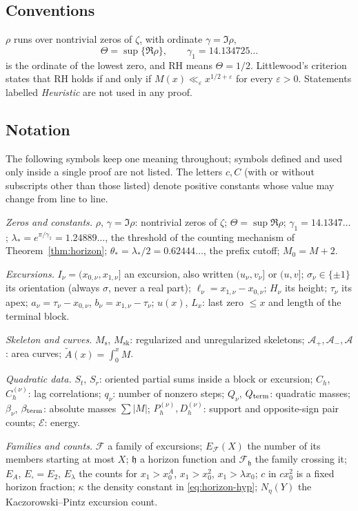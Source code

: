 \documentclass[11pt]{amsart}
\numberwithin{equation}{section}
\theoremstyle{plain}
\theoremstyle{definition}
\theoremstyle{remark}
\newcommand{\Ms}{M_{\mathrm{s}}}
\newcommand{\Msk}{M_{\mathrm{sk}}}
\newcommand{\Ap}{\mathcal{A}_{+}}
\newcommand{\Am}{\mathcal{A}_{-}}
\newcommand{\Anet}{\mathcal{A}}
\newcommand{\eps}{\varepsilon}
\newcommand{\En}{\mathcal{E}}
\newcommand{\F}{\mathcal{F}}
\begin{document}
\subsection*{Conventions}
$\rho$ runs over nontrivial zeros of $\zeta$, with ordinate $\gamma=\Im\rho$,
\[
\Theta=\sup\{\Re\rho\},\qquad \gamma_1=14.134725\ldots
\]
is the ordinate of the lowest zero, and RH means $\Theta=1/2$. Littlewood's
criterion \cite[\S14.25]{Titchmarsh1986} states that RH holds if and only if
$M(x)\ll_\eps x^{1/2+\eps}$ for every $\eps>0$. Statements labelled
\emph{Heuristic} are not used in any proof.

\subsection*{Notation}
\label{subsec:notation}
The following symbols keep one meaning throughout; symbols defined and used
only inside a single proof are not listed. The letters $c,C$ (with or without
subscripts other than those listed) denote positive constants whose value may
change from line to line.

\smallskip
\noindent\emph{Zeros and constants.}
$\rho$, $\gamma=\Im\rho$: nontrivial zeros of $\zeta$;
$\Theta=\sup\Re\rho$;
$\gamma_1=14.1347\ldots$;
$\lambda_*=e^{\pi/\gamma_1}=1.24889\ldots$, the threshold of the counting
mechanism of Theorem~\ref{thm:horizon};
$\theta_*=\lambda_*/2=0.62444\ldots$, the prefix cutoff;
$M_0=M+2$.

\smallskip
\noindent\emph{Excursions.}
$I_\nu=(x_{0,\nu},x_{1,\nu}]$ an excursion, also written $(u_\nu,v_\nu]$ or
$(u,v]$; $\sigma_\nu\in\{\pm1\}$ its orientation (always $\sigma$, never a
real part); $\ell_\nu=x_{1,\nu}-x_{0,\nu}$; $H_\nu$ its height; $\tau_\nu$ its
apex; $a_\nu=\tau_\nu-x_{0,\nu}$, $b_\nu=x_{1,\nu}-\tau_\nu$;
$u(x)$, $L_x$: last zero $\le x$ and length of the terminal block.

\smallskip
\noindent\emph{Skeleton and curves.}
$\Ms$, $\Msk$: regularized and unregularized skeletons;
$\Ap,\Am,\Anet$: area curves; $\widetilde A(x)=\int_0^xM$.

\smallskip
\noindent\emph{Quadratic data.}
$S_t$, $S_r$: oriented partial sums inside a block or excursion;
$C_h$, $C_h^{(\nu)}$: lag correlations; $q_\nu$: number of nonzero steps;
$Q_\nu$, $Q_{\rm term}$: quadratic masses; $\beta_\nu$, $\beta_{\rm term}$:
absolute masses $\sum|M|$; $P_h^{(\nu)},D_h^{(\nu)}$: support and
opposite-sign pair counts; $\En$: energy.

\smallskip
\noindent\emph{Families and counts.}
$\F$ a family of excursions; $E_\F(X)$ the number of its members starting at
most $X$; $\mathfrak h$ a horizon function and $\F_{\mathfrak h}$ the family
crossing it; $E_A$, $E_\square=E_2$, $E_\lambda$ the counts for
$x_1>x_0^A$, $x_1>x_0^2$, $x_1>\lambda x_0$; $c$ in $cx_0^2$ is a fixed
horizon fraction; $\kappa$ the density constant in \eqref{eq:horizon-hyp};
$N_\eta(Y)$ the Kaczorowski--Pintz excursion count.
\end{document}
